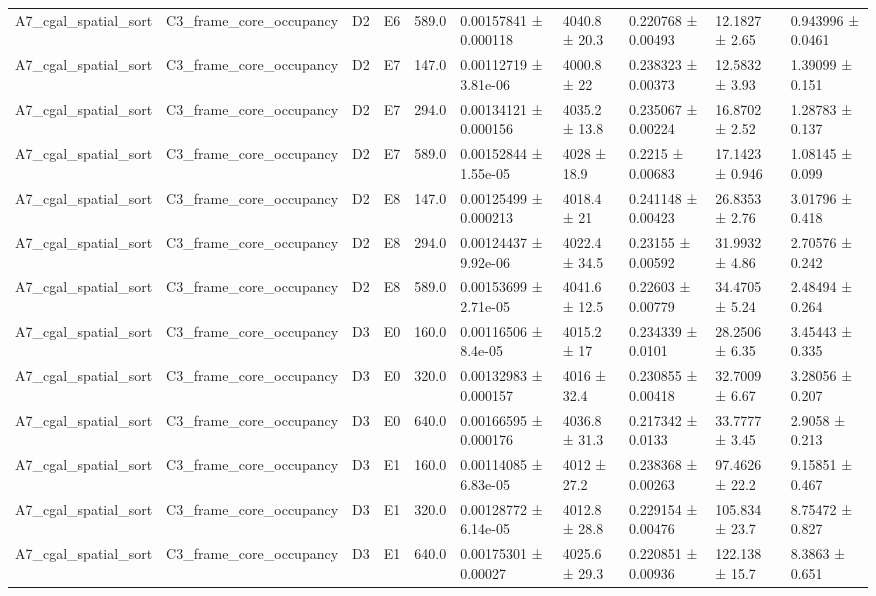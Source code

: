 \begin{table}
\begin{tabular}{llllllllll}
A7\_cgal\_spatial\_sort & C3\_frame\_core\_occupancy & D2 & E6 & 589.0 & 0.00157841 ± 0.000118 & 4040.8 ± 20.3 & 0.220768 ± 0.00493 & 12.1827 ± 2.65 & 0.943996 ± 0.0461 \\
A7\_cgal\_spatial\_sort & C3\_frame\_core\_occupancy & D2 & E7 & 147.0 & 0.00112719 ± 3.81e-06 & 4000.8 ± 22 & 0.238323 ± 0.00373 & 12.5832 ± 3.93 & 1.39099 ± 0.151 \\
A7\_cgal\_spatial\_sort & C3\_frame\_core\_occupancy & D2 & E7 & 294.0 & 0.00134121 ± 0.000156 & 4035.2 ± 13.8 & 0.235067 ± 0.00224 & 16.8702 ± 2.52 & 1.28783 ± 0.137 \\
A7\_cgal\_spatial\_sort & C3\_frame\_core\_occupancy & D2 & E7 & 589.0 & 0.00152844 ± 1.55e-05 & 4028 ± 18.9 & 0.2215 ± 0.00683 & 17.1423 ± 0.946 & 1.08145 ± 0.099 \\
A7\_cgal\_spatial\_sort & C3\_frame\_core\_occupancy & D2 & E8 & 147.0 & 0.00125499 ± 0.000213 & 4018.4 ± 21 & 0.241148 ± 0.00423 & 26.8353 ± 2.76 & 3.01796 ± 0.418 \\
A7\_cgal\_spatial\_sort & C3\_frame\_core\_occupancy & D2 & E8 & 294.0 & 0.00124437 ± 9.92e-06 & 4022.4 ± 34.5 & 0.23155 ± 0.00592 & 31.9932 ± 4.86 & 2.70576 ± 0.242 \\
A7\_cgal\_spatial\_sort & C3\_frame\_core\_occupancy & D2 & E8 & 589.0 & 0.00153699 ± 2.71e-05 & 4041.6 ± 12.5 & 0.22603 ± 0.00779 & 34.4705 ± 5.24 & 2.48494 ± 0.264 \\
A7\_cgal\_spatial\_sort & C3\_frame\_core\_occupancy & D3 & E0 & 160.0 & 0.00116506 ± 8.4e-05 & 4015.2 ± 17 & 0.234339 ± 0.0101 & 28.2506 ± 6.35 & 3.45443 ± 0.335 \\
A7\_cgal\_spatial\_sort & C3\_frame\_core\_occupancy & D3 & E0 & 320.0 & 0.00132983 ± 0.000157 & 4016 ± 32.4 & 0.230855 ± 0.00418 & 32.7009 ± 6.67 & 3.28056 ± 0.207 \\
A7\_cgal\_spatial\_sort & C3\_frame\_core\_occupancy & D3 & E0 & 640.0 & 0.00166595 ± 0.000176 & 4036.8 ± 31.3 & 0.217342 ± 0.0133 & 33.7777 ± 3.45 & 2.9058 ± 0.213 \\
A7\_cgal\_spatial\_sort & C3\_frame\_core\_occupancy & D3 & E1 & 160.0 & 0.00114085 ± 6.83e-05 & 4012 ± 27.2 & 0.238368 ± 0.00263 & 97.4626 ± 22.2 & 9.15851 ± 0.467 \\
A7\_cgal\_spatial\_sort & C3\_frame\_core\_occupancy & D3 & E1 & 320.0 & 0.00128772 ± 6.14e-05 & 4012.8 ± 28.8 & 0.229154 ± 0.00476 & 105.834 ± 23.7 & 8.75472 ± 0.827 \\
A7\_cgal\_spatial\_sort & C3\_frame\_core\_occupancy & D3 & E1 & 640.0 & 0.00175301 ± 0.00027 & 4025.6 ± 29.3 & 0.220851 ± 0.00936 & 122.138 ± 15.7 & 8.3863 ± 0.651 \\

\end{tabular}
\end{table}
